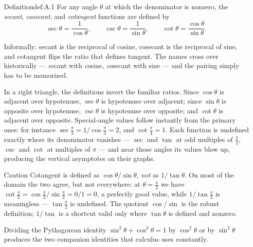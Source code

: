 \documentclass[a4paper,12pt,oneside]{memoir}
\begin{document}
\begin{envdefinition}{Definition}{def:A.1}{}
For any angle \(\theta\) at which the denominator is nonzero, the \emph{secant}, \emph{cosecant}, and \emph{cotangent} functions are defined by \[ \sec\theta = \frac{1}{\cos\theta}, \qquad \csc\theta = \frac{1}{\sin\theta}, \qquad \cot\theta = \frac{\cos\theta}{\sin\theta}. \]

\begin{informal}
Informally: secant is the reciprocal of cosine, cosecant is the reciprocal of sine, and cotangent flips the ratio that defines tangent. The names cross over historically — \emph{se}cant with \emph{co}sine, \emph{co}secant with sine — and the pairing simply has to be memorized.
\end{informal}
\end{envdefinition}
In a right triangle, the definitions invert the familiar ratios. Since \(\cos\theta\) is adjacent over hypotenuse, \(\sec\theta\) is hypotenuse over adjacent; since \(\sin\theta\) is opposite over hypotenuse, \(\csc\theta\) is hypotenuse over opposite; and \(\cot\theta\) is adjacent over opposite. Special-angle values follow instantly from the primary ones: for instance \(\sec\tfrac{\pi}{3} = 1/\cos\tfrac{\pi}{3} = 2\), and \(\cot\tfrac{\pi}{4} = 1\). Each function is undefined exactly where its denominator vanishes — \(\sec\) and \(\tan\) at odd multiples of \(\tfrac{\pi}{2}\), \(\csc\) and \(\cot\) at multiples of \(\pi\) — and near those angles its values blow up, producing the vertical asymptotes on their graphs.

\begin{envcaution}{Caution}{}{}
Cotangent is defined as \(\cos\theta/\sin\theta\), \emph{not} as \(1/\tan\theta\). On most of the domain the two agree, but not everywhere: at \(\theta = \tfrac{\pi}{2}\) we have \(\cot\tfrac{\pi}{2} = \cos\tfrac{\pi}{2}/\sin\tfrac{\pi}{2} = 0/1 = 0\), a perfectly good value, while \(1/\tan\tfrac{\pi}{2}\) is meaningless — \(\tan\tfrac{\pi}{2}\) is undefined. The quotient \(\cos/\sin\) is the robust definition; \(1/\tan\) is a shortcut valid only where \(\tan\theta\) is defined and nonzero.
\end{envcaution}
Dividing the Pythagorean identity \(\sin^{2}\theta + \cos^{2}\theta = 1\) by \(\cos^{2}\theta\) or by \(\sin^{2}\theta\) produces the two companion identities that calculus uses constantly.
\end{document}

